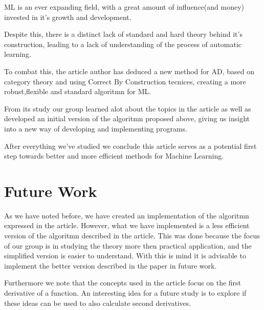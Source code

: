 \documentclass[11pt,a4]{article}
\theoremstyle{definition}
\theoremstyle{Definition}
\theoremstyle{Definition}
\begin{document}
	ML is an ever expanding field, with a great amount of influence(and money) invested in it's growth and development.

	Despite this, there is a distinct lack of standard and hard theory behind it's construction, leading to a lack of understanding of the process of automatic learning.

	To combat this, the article author has deduced a new method for AD, based on category theory and using Correct By Construction tecnices, creating a more robust,flexible and standard algoritmn for ML.

	From its study our group learned alot about the topics in the article as well as developed an initial version of the algoritmn proposed above, giving us insight into a new way of developing and implementing programs.

	After everything we've studied we conclude this article serves as a potential first step towards better and more efficient methods for Machine Learning.



	\section{Future Work}

	As we have noted before, we have created an implementation of the algoritmn expressed in the article.
	However, what we have implemented is a less efficient version of the algoritmn described in the article.
	This was done because the focus of our group is in studying the theory more then practical application, and the simplified version is easier to understand.
	With this is mind it is advisable to implement the better version described in the paper in future work.

	Furthermore we note that the concepts used in the article focus on the first derivative of a function.
	An interesting idea for a future study is to explore if these ideas can be used to also calculate second derivatives.
	
	
	\newpage



    
\end{document}
